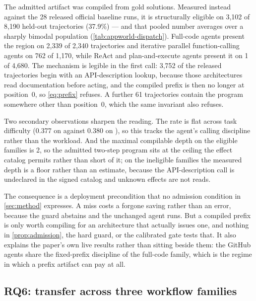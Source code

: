 The admitted artifact was compiled from gold solutions. Measured instead against the 28
released official baseline runs, it is structurally eligible on 3,102 of 8,190 held-out
trajectories (37.9\%) --- and that pooled number averages over a sharply bimodal population
(\cref{tab:appworld-dispatch}). Full-code agents present the region on 2,339 of 2,340
trajectories and iterative parallel function-calling agents on 762 of 1,170, while ReAct and
plan-and-execute agents present it on 1 of 4,680. The mechanism is legible in the first call:
3,752 of the released trajectories begin with an API-description lookup, because those
architectures read documentation before acting, and the compiled prefix is then no longer at
position~0, so \eqref{eq:prefix} refuses. A further 61 trajectories contain the program
somewhere other than position~0, which the same invariant also refuses.

Two secondary observations sharpen the reading. The rate is flat across task difficulty
(0.377 on  against 0.380 on ), so this tracks the
agent's calling discipline rather than the workload. And the maximal compilable depth on the
eligible families is 2, so the admitted two-step program sits at the ceiling the effect
catalog permits rather than short of it; on the ineligible families the measured depth is a
floor rather than an estimate, because the API-description call is undeclared in the signed
catalog and unknown effects are not reads.

The consequence is a deployment precondition that no admission condition in
\cref{sec:method} expresses. A miss costs a forgone saving rather than an error, because the
guard abstains and the unchanged agent runs. But a compiled prefix is only worth compiling
for an architecture that actually issues one, and nothing in \cref{prop:admission}, the hard
guard, or the calibrated gate tests that. It also explains the paper's own live results
rather than sitting beside them: the GitHub agents share the fixed-prefix discipline of the
full-code family, which is the regime in which a prefix artifact can pay at all.

\subsection{RQ6: transfer across three workflow families}
\label{sec:family-results}

\begin{table}[t]
  \centering
  \caption{Primary real-record, live-provider results.  Entries are reductions from the
  unchanged baseline; exact counts are paired held-out task contracts. ``Interfaces''
  counts provider-visible tool calls, not the three verified reads inside a composite.}
  \label{tab:github-families}
  \resizebox{\textwidth}{!}{}
\end{table}

